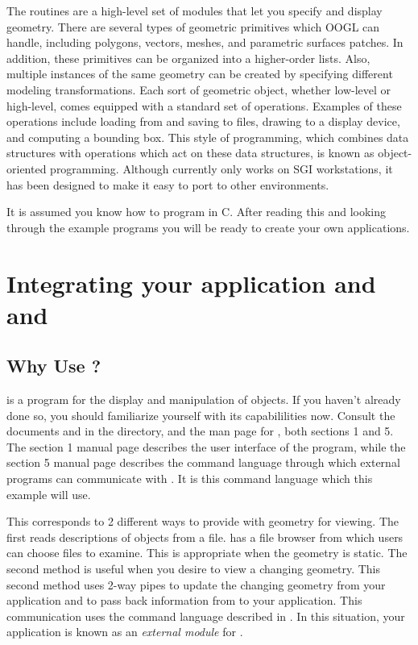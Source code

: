 The {\OOGL} routines are a high-level set of modules that let you specify
and display geometry.  There are several types of geometric
primitives which OOGL can handle, including polygons, vectors,
meshes, and parametric surfaces patches.  In addition, these primitives
can be organized into a higher-order lists.  
Also, multiple instances of the same geometry can be
created by specifying different modeling transformations.
Each sort of geometric object, whether low-level or high-level,
comes equipped with a standard set of operations.
Examples of these operations include 
loading from and saving to files, 
drawing to a display device,
and computing a bounding box.
This style of programming, which combines data structures
with operations which act on these data structures, is known as
object-oriented programming.
Although currently {\OOGL} only works on SGI workstations, it
has been designed to make it easy to port to other environments.

It is assumed you know how to program in C.  After reading this and
looking through the example programs you will be ready to create your
own {\OOGL} applications.

\section{Integrating your application and and }

\subsection{Why Use ?}

 is a program for the display and
manipulation of {\OOGL} objects.  
If you haven't already done so, you should familiarize yourself
with its capabililities now. Consult the documents  
 and   in the
 directory, and the man page
for , both sections 1 and 5.
The section 1 manual page describes the user interface
of the program, while the section 5 manual page describes
the command language through which external programs
can communicate with .   It is this
command language which this example will use.

This corresponds to 2 different ways to provide 
with geometry for viewing.  The first reads descriptions of objects
from a file.  has a file browser from 
which users can choose files to examine.
This is appropriate when the geometry is static.  The
second method is useful when you desire to view a changing geometry.
This second method uses 2-way pipes to update the changing geometry
from your application
and to pass back information from  to your application.
This communication uses the command language described in
.
In this situation, your application is known as an {\em external
module} for .

